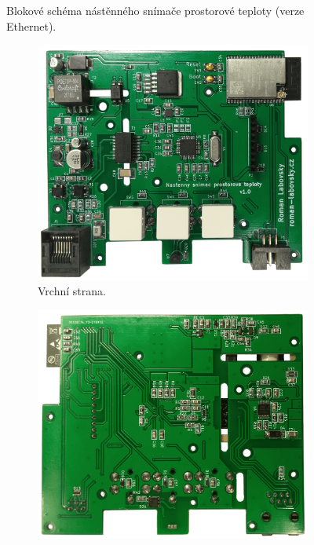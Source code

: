 \begin{figure}[H]
    \centering
    \def\svgwidth{\columnwidth}
    
    \caption[]{Blokové schéma nástěnného snímače prostorové teploty (verze Ethernet).}
    \label{fig:blokove-schema-nastenny-snimac-teploty-ethernet}
\end{figure}


\begin{figure}[H]
\centering
\begin{subfigure}{.5\textwidth}
  \centering
  \includegraphics[width=\textwidth]{images/nastenny-snimac-prostorove-teploty-ethernet/dps-nastenny-snimac-prostorove-teploty-ethernet-vrchni-cast.png}
  \caption{Vrchní strana.}
  \label{fig:dps-nastenny-snimac-prostorove-teploty-ethernet-vrchni-cast}
\end{subfigure}%
\begin{subfigure}{.5\textwidth}
  \centering
  \includegraphics[width=\textwidth]{images/nastenny-snimac-prostorove-teploty-ethernet/dps-nastenny-snimac-prostorove-teploty-ethernet-spodni-cast.png}

\end{subfigure}
\end{figure}

